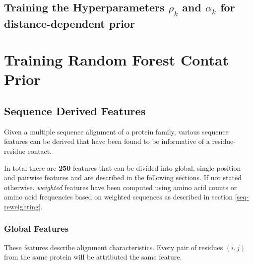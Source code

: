 \documentclass[12pt,a4paper,twoside]{book}
\theoremstyle{definition}
\theoremstyle{definition}
\theoremstyle{remark}
\begin{document}
\subsection{\texorpdfstring{Training the Hyperparameters \(\rho_k\) and
\(\alpha_k\) for distance-dependent
prior}{Training the Hyperparameters \textbackslash{}rho\_k and \textbackslash{}alpha\_k for distance-dependent prior}}\label{training-the-hyperparameters-rho_k-and-alpha_k-for-distance-dependent-prior}

\section{Training Random Forest Contat
Prior}\label{training-random-forest-contat-prior}

\subsection{Sequence Derived Features}\label{seq-features}

Given a multiple sequence alignment of a protein family, various
sequence features can be derived that have been found to be informative
of a residue-residue contact.

In total there are \textbf{250} features that can be divided into
global, single position and pairwise features and are described in the
following sections. If not stated otherwise, \emph{weighted} features
have been computed using amino acid counts or amino acid frequencies
based on weighted sequences as described in section
\ref{seq-reweighting}.

\subsubsection{Global Features}\label{seq-features-global}

These features describe alignment characteristics. Every pair of
residues \((i,j)\) from the same protein will be attributed the same
feature.
\end{document}
